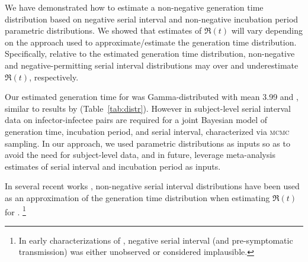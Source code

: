 We have demonstrated how to estimate
a non-negative generation time distribution
based on negative serial interval
and non-negative incubation period parametric distributions.
We showed that estimates of $\Re(t)$ will vary depending on
the approach used to approximate/estimate the generation time distribution.
Specifically, relative to the estimated generation time distribution,
non-negative and negative-permitting serial interval distributions
may over and underestimate $\Re(t)$, respectively.
\par
Our estimated generation time for \covid was
Gamma-distributed with mean 3.99 and ,
similar to results by \textcite{Ganyani2020} (Table~\ref{tab:distr}).
However in \cite{Ganyani2020}
subject-level serial interval data on infector-infectee pairs
are required for a joint Bayesian model of
generation time, incubation period, and serial interval,
characterized via \textsc{mcmc} sampling.
In our approach, we used parametric distributions as inputs
so as to avoid the need for subject-level data,
and in future, leverage meta-analysis estimates of
serial interval and incubation period as inputs.
\par
In several recent works \cite{You2020,Tang2020,Zhang2020a,Zhang2020},
non-negative serial interval distributions have been used
as an approximation of the generation time distribution
when estimating $\Re(t)$ for \covid.%
\footnote{In early characterizations of \covid
  \cite{Li2020,Zhang2020,Nishiura2020,Zhao2020,You2020},
  negative serial interval (and pre-symptomatic transmission)
  was either unobserved or considered implausible.}
